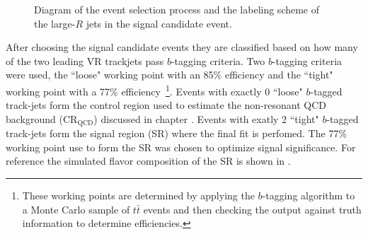 \begin{figure}[!htbp]
  \centering
{}

  \caption{\cite{Feickert:2690521} Diagram of the event selection process and the labeling scheme of the large-$R$ jets in the signal candidate event.}
  \label{fig:event_selection}
\end{figure}

After choosing the signal candidate events they are classified based on how
many of the two leading VR trackjets pass $b$-tagging criteria.  Two
$b$-tagging criteria were used, the ``loose" working point with an 85\%
efficiency and the ``tight" working point with a 77\%
efficiency~\footnote{These working points are determined by applying the
$b$-tagging algorithm to a Monte Carlo sample of $t\bar{t}$ events and then
checking the output against truth information to determine efficiencies.}.
Events with exactly 0 ``loose" $b$-tagged track-jets form the control region
used to estimate the non-resonant QCD background ($\text{CR}_{\text{QCD}}$)
discussed in chapter .  Events with exatly 2 ``tight"
$b$-tagged track-jets form the signal region (SR) where the final fit is
perfomed.  The 77\% working point use to form the SR was chosen to optimize
signal significance.  For reference the simulated flavor composition of the SR
is shown in .

